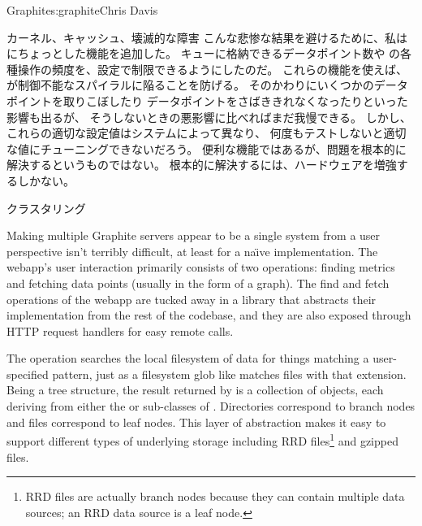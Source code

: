 \begin{aosachapter}{Graphite}{s:graphite}{Chris Davis}
\begin{aosasect1}{カーネル、キャッシュ、壊滅的な障害}
こんな悲惨な結果を避けるために、私はにちょっとした機能を追加した。
キューに格納できるデータポイント数や
の各種操作の頻度を、設定で制限できるようにしたのだ。
これらの機能を使えば、が制御不能なスパイラルに陥ることを防げる。
そのかわりにいくつかのデータポイントを取りこぼしたり
データポイントをさばききれなくなったりといった影響も出るが、
そうしないときの悪影響に比べればまだ我慢できる。
しかし、これらの適切な設定値はシステムによって異なり、
何度もテストしないと適切な値にチューニングできないだろう。
便利な機能ではあるが、問題を根本的に解決するというものではない。
根本的に解決するには、ハードウェアを増強するしかない。

\end{aosasect1}

\begin{aosasect1}{クラスタリング}

Making multiple Graphite servers appear to be a single system from
a user perspective isn't terribly difficult, at least for a na\"{\i}ve
implementation.  The webapp's user interaction primarily consists of
two operations: finding metrics and fetching data points (usually in
the form of a graph). The find and fetch operations of the webapp are
tucked away in a library that abstracts their implementation from the
rest of the codebase, and they are also exposed through HTTP request
handlers for easy remote calls.

The  operation searches the local filesystem of 
data for things matching a user-specified pattern, just as a filesystem
glob like  matches files with that extension.
Being a tree structure, the result returned by  is a
collection of  objects, each deriving from either the  or
 sub-classes of . Directories correspond to branch nodes and
 files correspond to leaf nodes.  This layer of abstraction
makes it easy to support different types of underlying storage
including RRD files\footnote{RRD files are actually branch nodes
because they can contain multiple data sources; an RRD data source
is a leaf node.} and gzipped  files.


\end{aosasect1}
\end{aosachapter}
